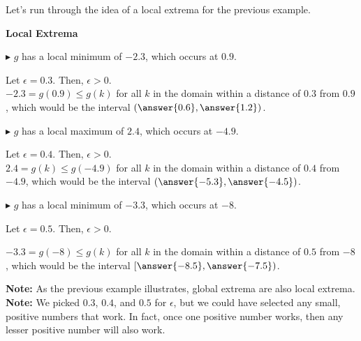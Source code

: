 \documentclass{ximera}
\begin{document}
Let's run through the idea of a local extrema for the previous example. 


\begin{explanation} \textbf{\textcolor{red!75!green}{Local Extrema}}





\textbf{\textcolor{blue!55!black}{$\blacktriangleright$}}  $g$ has a local minimum of $-2.3$, which occurs at $0.9$. 


Let $\epsilon = 0.3$.  Then, $\epsilon > 0$.   \\
$-2.3 = g(0.9) \leq g(k)$ for all $k$ in the domain within a distance of $0.3$ from $0.9$, which would be the interval $\left(\answer{0.6}, \answer{1.2}\right)$.




\textbf{\textcolor{blue!55!black}{$\blacktriangleright$}} $g$ has a local maximum of $2.4$, which occurs at $-4.9$. 






Let $\epsilon = 0.4$.  Then, $\epsilon > 0$.  \\
$2.4 = g(k) \leq g(-4.9)$ for all $k$ in the domain within a distance of $0.4$ from $-4.9$, which would be the interval $\left(\answer{-5.3}, \answer{-4.5}\right)$.




\textbf{\textcolor{blue!55!black}{$\blacktriangleright$}} $g$ has a local minimum of $-3.3$, which occurs at $-8$. 





Let $\epsilon = 0.5$.  Then, $\epsilon > 0$. 

$-3.3 = g(-8) \leq g(k)$ for all $k$ in the domain within a distance of $0.5$ from $-8$, which would be the interval $\left[\answer{-8.5}, \answer{-7.5}\right)$.


\end{explanation}


\textbf{Note:} As the previous example illustrates, global extrema are also local extrema. \\
\textbf{Note:} We picked $0.3$, $0.4$, and $0.5$ for $\epsilon$, but we could have selected any small, positive numbers that work. In fact, once one positive number works, then any lesser positive number will also work. 
\end{document}
